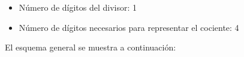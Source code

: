 \documentclass[svgnames,addpoints]{exam}
\newlength{\zerowidth}
\newlength{\zeroheight}
\begin{document}
\begin{questions}
\begin{itemize}
  \item Número de dígitos del divisor: 1
    
  \item Número de dígitos necesarios para representar el cociente: 4
    
  \end{itemize}  
  
  El esquema general se muestra a continuación:

  \noindent\begin{minipage}{0.25\linewidth}
    \begin{center}
\end{center}
\end{minipage}
\end{questions}
\end{document}
